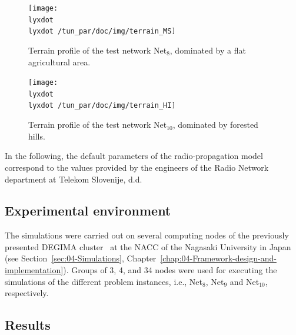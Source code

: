 \begin{figure}
\begin{minipage}[t]{0.49\textwidth}%
\centering

\texttt{[image: \\lyxdot \\lyxdot /tun\_par/doc/img/terrain\_MS]}

\caption{Terrain profile of the test network Net$_{8}$, dominated by a flat
agricultural area. \label{fig:05-Terrain_profile_for_Net8}}
%
\end{minipage}\hfill{}%
\begin{minipage}[t]{0.49\textwidth}%
\centering

\texttt{[image: \\lyxdot \\lyxdot /tun\_par/doc/img/terrain\_HI]}

\caption{Terrain profile of the test network Net$_{10}$, dominated by forested
hills. \label{fig:05-Terrain_profile_for_Net10}}
%
\end{minipage}
\end{figure}


In the following, the default parameters of the radio-propagation
model correspond to the values provided by the engineers of the Radio
Network department at Telekom Slovenije, d.d.


\subsection{Experimental environment \label{sub:05-Experimental_environment}}

The simulations were carried out on several computing nodes of the
previously presented DEGIMA cluster~\cite{Hamada_Cluster_of_GPUs:2010}
at the NACC of the Nagasaki University in Japan (see Section~\ref{sec:04-Simulations},
Chapter~\ref{chap:04-Framework-design-and-implementation}). Groups
of 3, 4, and 34 nodes were used for executing the simulations of the
different problem instances, i.e., Net$_{8}$, Net$_{9}$ and Net$_{10}$,
respectively.


\subsection{Results \label{sub:05-Least_squares_results}}

